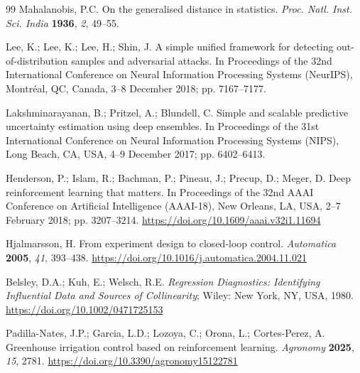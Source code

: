 \begin{thebibliography}{99}
Mahalanobis, P.C. On the generalised distance in statistics. \textit{Proc. Natl. Inst. Sci.
India} \textbf{1936}, \textit{2}, 49--55.

Lee, K.; Lee, K.; Lee, H.; Shin, J. A simple unified framework for detecting
out-of-distribution samples and adversarial attacks. In Proceedings of the 32nd International
Conference on Neural Information Processing Systems (NeurIPS), Montr\'eal, QC, Canada,
3--8 December 2018; pp. 7167--7177.

Lakshminarayanan, B.; Pritzel, A.; Blundell, C. Simple and scalable predictive uncertainty
estimation using deep ensembles. In Proceedings of the 31st International Conference on
Neural Information Processing Systems (NIPS), Long Beach, CA, USA, 4--9 December 2017;
pp. 6402--6413.

Henderson, P.; Islam, R.; Bachman, P.; Pineau, J.; Precup, D.; Meger, D. Deep reinforcement
learning that matters. In Proceedings of the 32nd AAAI Conference on Artificial Intelligence
(AAAI-18), New Orleans, LA, USA, 2--7 February 2018; pp. 3207--3214.
\url{https://doi.org/10.1609/aaai.v32i1.11694}

Hjalmarsson, H. From experiment design to closed-loop control. \textit{Automatica}
\textbf{2005}, \textit{41}, 393--438.
\url{https://doi.org/10.1016/j.automatica.2004.11.021}

Belsley, D.A.; Kuh, E.; Welsch, R.E. \textit{Regression Diagnostics: Identifying Influential
Data and Sources of Collinearity}; Wiley: New York, NY, USA, 1980.
\url{https://doi.org/10.1002/0471725153}

Padilla-Nates, J.P.; Garcia, L.D.; Lozoya, C.; Orona, L.; Cortes-Perez, A.
Greenhouse irrigation control based on reinforcement learning. \textit{Agronomy}
\textbf{2025}, \textit{15}, 2781.
\url{https://doi.org/10.3390/agronomy15122781}

\end{thebibliography}


